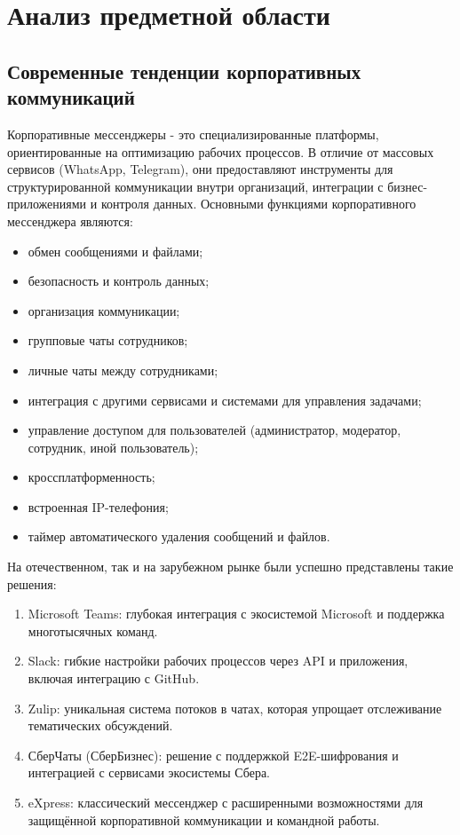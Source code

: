 \section{Анализ предметной области}
\subsection{Современные тенденции корпоративных коммуникаций}

Корпоративные мессенджеры - это специализированные платформы, ориентированные на оптимизацию рабочих процессов. В отличие от массовых сервисов (WhatsApp, Telegram), они предоставляют инструменты для структурированной коммуникации внутри организаций, интеграции с бизнес-приложениями и контроля данных.
Основными функциями корпоративного мессенджера являются:
\begin{itemize}
	\item обмен сообщениями и файлами;
	\item безопасность и контроль данных;
	\item организация коммуникации;
	\item групповые чаты сотрудников;
	\item личные чаты между сотрудниками;
	\item интеграция с другими сервисами и системами для управления задачами;
	\item управление доступом для пользователей (администратор, модератор, сотрудник, иной пользователь);
	\item кроссплатформенность;
	\item встроенная IP-телефония;
	\item таймер автоматического удаления сообщений и файлов.
\end{itemize}


На отечественном, так и на зарубежном рынке были успешно представлены такие решения:
\begin{enumerate}
	\item Microsoft Teams: глубокая интеграция с экосистемой Microsoft и поддержка многотысячных команд.
	\item Slack: гибкие настройки рабочих процессов через API и приложения, включая интеграцию с GitHub.
	\item Zulip: уникальная система потоков в чатах, которая упрощает отслеживание тематических обсуждений.
	\item СберЧаты (СберБизнес): решение с поддержкой E2E-шифрования и интеграцией с сервисами экосистемы Сбера.
	\item eXpress: классический мессенджер с расширенными возможностями для защищённой корпоративной коммуникации и командной работы.
\end{enumerate}

